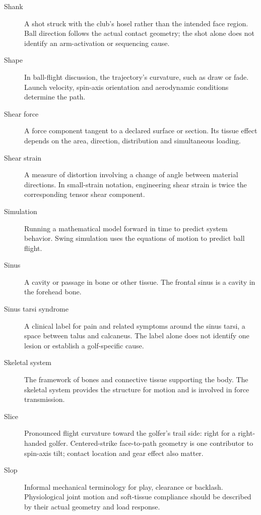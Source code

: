 \begin{description}
\item[Shank] A shot struck with the club's hosel rather than the intended face region. Ball direction follows the actual contact geometry; the shot alone does not identify an arm-activation or sequencing cause.

\item[Shape] In ball-flight discussion, the trajectory's curvature, such as draw or fade. Launch velocity, spin-axis orientation and aerodynamic conditions determine the path.

\item[Shear force] A force component tangent to a declared surface or section. Its tissue effect depends on the area, direction, distribution and simultaneous loading.

\item[Shear strain] A measure of distortion involving a change of angle between material directions. In small-strain notation, engineering shear strain is twice the corresponding tensor shear component.

\item[Simulation] Running a mathematical model forward in time to predict system behavior. Swing simulation uses the equations of motion to predict ball flight.

\item[Sinus] A cavity or passage in bone or other tissue. The frontal sinus is a cavity in the forehead bone.

\item[Sinus tarsi syndrome] A clinical label for pain and related symptoms around the sinus tarsi, a space between talus and calcaneus. The label alone does not identify one lesion or establish a golf-specific cause.

\item[Skeletal system] The framework of bones and connective tissue supporting the body. The skeletal system provides the structure for motion and is involved in force transmission.

\item[Slice] Pronounced flight curvature toward the golfer's trail side: right for a right-handed golfer. Centered-strike face-to-path geometry is one contributor to spin-axis tilt; contact location and gear effect also matter.

\item[Slop] Informal mechanical terminology for play, clearance or backlash. Physiological joint motion and soft-tissue compliance should be described by their actual geometry and load response.


\end{description}
